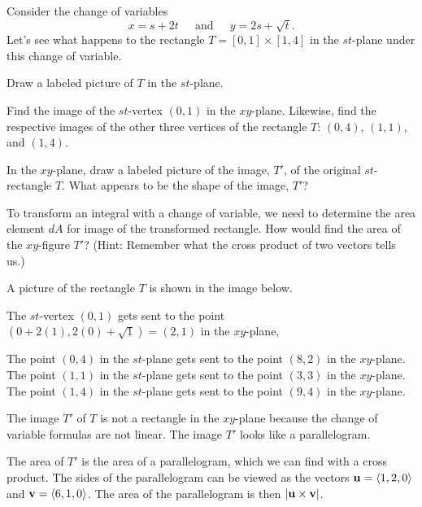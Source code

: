 \begin{activity} \label{A:11.9.1}  Consider the change of variables
\[x = s + 2 t \ \ \ \ \ \text{ and } \ \ \ \ \ y = 2 s + \sqrt{t}.\]
Let's see what happens to the rectangle $T = [0,1] \times [1,4]$ in the $st$-plane under this change of variable.
	\ba
	\item Draw a labeled picture of $T$ in the $st$-plane.
	
	\item Find the image of the $st$-vertex $(0,1)$ in the $xy$-plane.  Likewise, find the respective images of the other three vertices of the rectangle $T$: $(0,4)$, $(1,1)$, and $(1,4)$.	
	
	\item In the $xy$-plane, draw a labeled picture of the image, $T'$, of the original $st$-rectangle $T$. What appears to be the shape of the image, $T'$?
	
	\item To transform an integral with a change of variable,  we need to determine the area element $dA$ for image of the  transformed rectangle. How would find the area of the $xy$-figure $T'$? (Hint: Remember what the cross product of two vectors tells us.)
	
	\ea

\end{activity}
\begin{smallhint}

\end{smallhint}
\begin{bighint}

\end{bighint}
\begin{activitySolution}
\ba
\item A picture of the rectangle $T$ is shown in the image below.
\item The $st$-vertex $(0,1)$ gets sent to the point $(0+2(1), 2(0)+\sqrt{1}) = (2,1)$ in the $xy$-plane,
\item The point $(0,4)$ in the $st$-plane gets sent to the point $(8,2)$ in the $xy$-plane. The point $(1,1)$ in the $st$-plane gets sent to the point $(3,3)$ in the $xy$-plane.  The point $(1,4)$ in the $st$-plane gets sent to the point $(9,4)$ in the $xy$-plane.
\item The image $T'$ of $T$ is not a rectangle in the $xy$-plane because the change of variable formulas are not linear. The image $T'$ looks like a parallelogram. 
\item The area of $T'$ is the area of a parallelogram, which we can find with a cross product. The sides of the parallelogram can be viewed as the vectors $\mathbf{u} = \langle 1, 2, 0\rangle$ and $\mathbf{v} = \langle 6, 1, 0 \rangle$. The area of the parallelogram is then $|\mathbf{u} \times \mathbf{v}|$. 
\ea
\begin{center}
\end{center}

\end{activitySolution}
\aftera